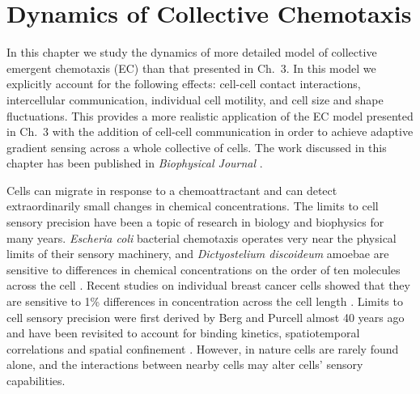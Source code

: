 
\chapter{Dynamics of Collective Chemotaxis}

In this chapter we study the dynamics of more detailed model of collective emergent chemotaxis (EC) than that presented in Ch.\ 3. In this model we explicitly account for the following effects: cell-cell contact interactions, intercellular communication, individual cell motility, and cell size and shape fluctuations. This provides a more realistic application of the EC model presented in Ch.\ 3 with the addition of cell-cell communication in order to achieve adaptive gradient sensing across a whole collective of cells. The work discussed in this chapter has been published in \textit{Biophysical Journal} \cite{varennes2016collective}.

Cells can migrate in response to a chemoattractant and can detect extraordinarily small changes in chemical concentrations. The limits to cell sensory precision have been a topic of research in biology and biophysics for many years. \textit{Escheria coli} bacterial chemotaxis operates very near the physical limits of their sensory machinery, and \textit{Dictyostelium discoideum} amoebae are sensitive to differences in chemical concentrations on the order of ten molecules across the cell \cite{berg1977physics,song2006dictyostelium}. Recent studies on individual breast cancer cells showed that they are sensitive to 1\% differences in concentration across the cell length \cite{shields2007autologous}. Limits to cell sensory precision were first derived by Berg and Purcell almost 40 years ago \cite{berg1977physics} and have been revisited to account for binding kinetics, spatiotemporal correlations and spatial confinement \cite{bialek2005physical, kaizu2014berg, bicknell2015limits}. However, in nature cells are rarely found alone, and the interactions between nearby cells may alter cells' sensory capabilities.

